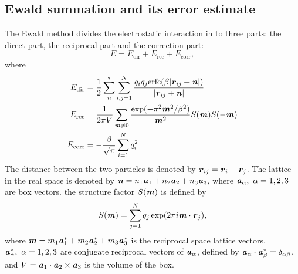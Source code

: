 \documentclass[aps,pre,preprint]{revtex4}
\renewcommand{\v}[1]{\textbf{\textit{#1}}}
\begin{document}
\subsection{Ewald summation and its error estimate}
The Ewald method divides the electrostatic interaction in to three
parts: the direct part, the reciprocal part and the correction
part:
\begin{equation}
E = E_{\textrm{dir}} + E_{\textrm{rec}} + E_{\textrm{corr}},
\end{equation}
where 
\begin {align}\label{eqn:tmp2}
E_{\textrm{dir}} & = \frac12 \sum^{\ast}_{\v n}
\sum_{i,j = 1}^{N} \frac{q_iq_j \textrm{erfc}(\beta \vert\v{r}_{ij} + \v{n}\vert)}
{\vert\v{r}_{ij} + \v{n}\vert} \\\label{eqn:tmp3}
E_{\textrm{rec}} & = \frac1{2\pi V} \sum_{\v m \neq 0}
\frac{\exp(-\pi^2\v m^2 / \beta^2)}{\v m^2} S(\v m) S(-\v m) \\\label{eqn:tmp4}
 E_{\textrm{corr}}& = -\frac\beta{\sqrt \pi} \sum_{i=1}^N q_i^2
\end {align}
The distance between the two particles is denoted by $\v r_{ij} = \v
r_i - \v r_j$.  The lattice in the real space is denoted
by $\v n = n_1 \v a_1 + n_2 \v a_2 + n_3 \v a_3$, where $\v a_\alpha,
\ \alpha=1,2,3$ are box vectors. the structure factor $S(\v m)$ is
defined by
\begin{equation}\label{sm1}
S(\v m) = \sum_{j=1}^N q_j \exp (2 \pi i \v m \cdot \v r_j),
\end{equation}
where $\v m = m_1 \v a_1^\ast + m_2 \v a_2^\ast + m_3 \v a_3^\ast$ is
the reciprocal space lattice vectors. $\v a_\alpha^\ast,\ \alpha = 1,
2, 3$ are conjugate reciprocal vectors of $\v a_\alpha$, defined by
$\v a_\alpha \cdot \v a_\beta^\ast = \delta_{\alpha\beta}$. and $V =
\v a_1 \cdot \v a_2 \times \v a_3$ is the volume of the box.
\end{document}
